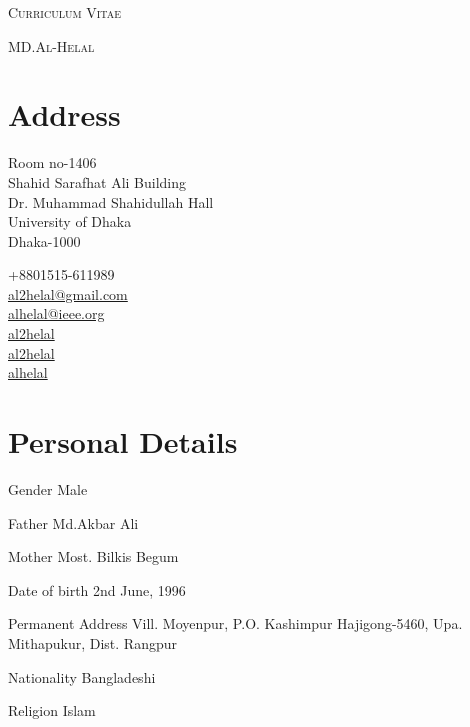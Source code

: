 \documentclass[a4paper]{article}
\begin{document}
\pagestyle{empty}

\begin{center}
\huge{\textsc{Curriculum Vitae}}
\vspace{\baselineskip}

\Large{\textsc{MD.Al-Helal}}\\
\end{center}
\vspace{1.5\baselineskip}

\section{Address}
\noindent
\begin{minipage}{.7\textwidth}
  Room no-1406\\
  Shahid Sarafhat Ali Building\\
  Dr. Muhammad Shahidullah Hall\\
  University of Dhaka\\
  Dhaka-1000\\
\end{minipage}
\begin{minipage}{.7\textwidth}
  \faPhone{} +8801515-611989\\
  \faEnvelopeO{}  \href{mailto:al2helal@gmail.com}{al2helal@gmail.com}\\
  \faEnvelopeO{}  \href{mailto:alhelal@ieee.org}{alhelal@ieee.org}\\
  \faGithub{}  \href{https://github.com/al2helal}{al2helal}\\
  \faLinkedin{}  \href{https://www.linkedin.com/in/mdalhelal/}{al2helal}\\
  \faStackOverflow{}  \href{https://stackoverflow.com/users/5697418/alhelal}{alhelal}
\end{minipage}

\section{Personal Details}
\begin{CV}
  \item[Gender] Male 
  \item[Father] Md.Akbar Ali
  \item[Mother] Most. Bilkis Begum
  \item[Date of birth] 2nd June, 1996
  \item[Permanent Address] Vill. Moyenpur, P.O. Kashimpur Hajigong-5460, Upa. Mithapukur, Dist. Rangpur
  \item[Nationality] Bangladeshi
  \item[Religion] Islam
  \end{CV}
\end{document}
